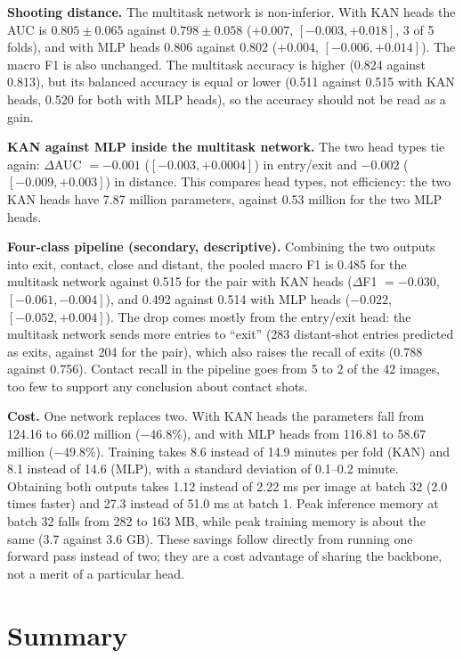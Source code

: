 \textbf{Shooting distance.} The multitask network is non-inferior. With KAN heads the AUC is $0.805 \pm 0.065$ against $0.798 \pm 0.058$ ($+0.007$, $[-0.003, +0.018]$, 3 of 5 folds), and with MLP heads $0.806$ against $0.802$ ($+0.004$, $[-0.006, +0.014]$). The macro F1 is also unchanged. The multitask accuracy is higher (0.824 against 0.813), but its balanced accuracy is equal or lower (0.511 against 0.515 with KAN heads, 0.520 for both with MLP heads), so the accuracy should not be read as a gain.



\textbf{KAN against MLP inside the multitask network.} The two head types tie again: $\Delta$AUC $= -0.001$ ($[-0.003, +0.0004]$) in entry/exit and $-0.002$ ($[-0.009, +0.003]$) in distance. This compares head types, not efficiency: the two KAN heads have 7.87 million parameters, against 0.53 million for the two MLP heads.

\textbf{Four-class pipeline (secondary, descriptive).} Combining the two outputs into exit, contact, close and distant, the pooled macro F1 is 0.485 for the multitask network against 0.515 for the pair with KAN heads ($\Delta$F1 $= -0.030$, $[-0.061, -0.004]$), and 0.492 against 0.514 with MLP heads ($-0.022$, $[-0.052, +0.004]$). The drop comes mostly from the entry/exit head: the multitask network sends more entries to ``exit'' (283 distant-shot entries predicted as exits, against 204 for the pair), which also raises the recall of exits (0.788 against 0.756). Contact recall in the pipeline goes from 5 to 2 of the 42 images, too few to support any conclusion about contact shots.



\textbf{Cost.} One network replaces two. With KAN heads the parameters fall from 124.16 to 66.02 million ($-46.8\%$), and with MLP heads from 116.81 to 58.67 million ($-49.8\%$). Training takes 8.6 instead of 14.9 minutes per fold (KAN) and 8.1 instead of 14.6 (MLP), with a standard deviation of 0.1--0.2 minute. Obtaining both outputs takes 1.12 instead of 2.22 ms per image at batch 32 (2.0 times faster) and 27.3 instead of 51.0 ms at batch 1. Peak inference memory at batch 32 falls from 282 to 163 MB, while peak training memory is about the same (3.7 against 3.6 GB). These savings follow directly from running one forward pass instead of two; they are a cost advantage of sharing the backbone, not a merit of a particular head.

\section{Summary}
\label{sec:results_summary}

